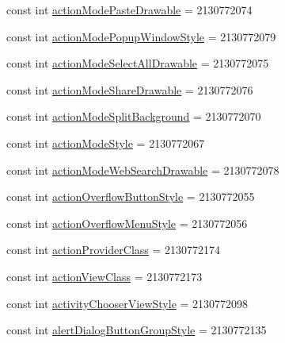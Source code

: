 \begin{DoxyCompactItemize}
\item 
const int \mbox{\hyperlink{class_f_w_p_s___app_1_1_droid_1_1_resource_1_1_attribute_a0312af899016bb5763f594122c939308}{action\+Mode\+Paste\+Drawable}} = 2130772074
\item 
const int \mbox{\hyperlink{class_f_w_p_s___app_1_1_droid_1_1_resource_1_1_attribute_aa26cfd4d668ec49a64c7fa4fe723b49e}{action\+Mode\+Popup\+Window\+Style}} = 2130772079
\item 
const int \mbox{\hyperlink{class_f_w_p_s___app_1_1_droid_1_1_resource_1_1_attribute_a925a1d0edd27e5bc4e531372ed25e242}{action\+Mode\+Select\+All\+Drawable}} = 2130772075
\item 
const int \mbox{\hyperlink{class_f_w_p_s___app_1_1_droid_1_1_resource_1_1_attribute_ae0857fbc6acf9e8378edeefc8aff85f0}{action\+Mode\+Share\+Drawable}} = 2130772076
\item 
const int \mbox{\hyperlink{class_f_w_p_s___app_1_1_droid_1_1_resource_1_1_attribute_a826e62996067a573171dcd99d30db080}{action\+Mode\+Split\+Background}} = 2130772070
\item 
const int \mbox{\hyperlink{class_f_w_p_s___app_1_1_droid_1_1_resource_1_1_attribute_a7a543c8d310684575dd565de1d142f81}{action\+Mode\+Style}} = 2130772067
\item 
const int \mbox{\hyperlink{class_f_w_p_s___app_1_1_droid_1_1_resource_1_1_attribute_afd8c7dab2ffb8a981edcdb835a273d64}{action\+Mode\+Web\+Search\+Drawable}} = 2130772078
\item 
const int \mbox{\hyperlink{class_f_w_p_s___app_1_1_droid_1_1_resource_1_1_attribute_acc3d8cb21db9002f50ad84508e868f42}{action\+Overflow\+Button\+Style}} = 2130772055
\item 
const int \mbox{\hyperlink{class_f_w_p_s___app_1_1_droid_1_1_resource_1_1_attribute_aa0e7492f2ad96210dcec3c5259dbb1b5}{action\+Overflow\+Menu\+Style}} = 2130772056
\item 
const int \mbox{\hyperlink{class_f_w_p_s___app_1_1_droid_1_1_resource_1_1_attribute_ae22a9bb5694dc52b0168d6867d3d9f6d}{action\+Provider\+Class}} = 2130772174
\item 
const int \mbox{\hyperlink{class_f_w_p_s___app_1_1_droid_1_1_resource_1_1_attribute_acb061c854cef6fbd195e3276894e6bdf}{action\+View\+Class}} = 2130772173
\item 
const int \mbox{\hyperlink{class_f_w_p_s___app_1_1_droid_1_1_resource_1_1_attribute_a107fae093f2ec2b4db8d954545fdd65c}{activity\+Chooser\+View\+Style}} = 2130772098
\item 
const int \mbox{\hyperlink{class_f_w_p_s___app_1_1_droid_1_1_resource_1_1_attribute_af32a69006ffde330638fccab4a28c7a2}{alert\+Dialog\+Button\+Group\+Style}} = 2130772135

\end{DoxyCompactItemize}
